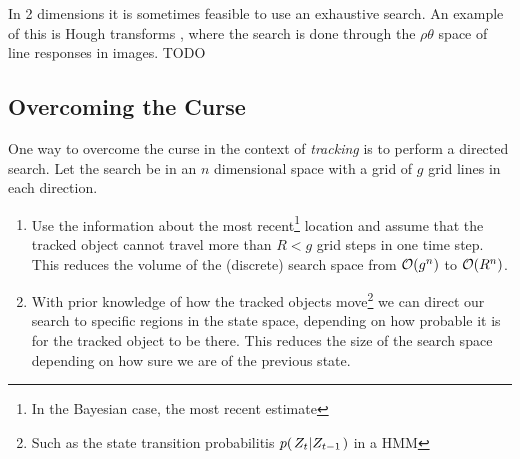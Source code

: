 \begin{example}
  In 2 dimensions it is sometimes feasible to use an exhaustive search. An example of this is Hough transforms \cite{DigitalImageProcessing}, where the search is done through the $\rho\theta$ space of line responses in images. TODO
\end{example}

\subsection{Overcoming the Curse}
One way to overcome the curse in the context of \emph{tracking} is to perform a directed search. Let the search be in an $n$ dimensional space with a grid of $g$ grid lines in each direction.

\begin{enumerate}
\item Use the information about the most recent\footnote{In the Bayesian case, the most recent estimate} location and assume that the tracked object cannot travel more than $R < g$ grid steps in one time step. This reduces the volume of the (discrete) search space from $\mathcal{O}{\left(g^n\right)}$ to $\mathcal{O}{\left(R^n\right)}$.
\item With prior knowledge of how the tracked objects move\footnote{Such as the state transition probabilitis $p{(\left. Z_t \middle\vert Z_{t-1} \right.)}$ in a HMM} we can direct our search to specific regions in the state space, depending on how probable it is for the tracked object to be there. This reduces the size of the search space depending on how sure we are of the previous state.
\end{enumerate} 


